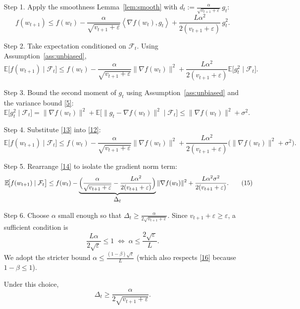 \documentclass{article}
\newcommand{\E}{\mathbb{E}}
\newcommand{\ip}[2]{\left\langle #1,#2 \right\rangle}
\begin{document}
\begin{enumerate}
\item[Step 1.] Apply the smoothness Lemma~\ref{lem:smooth} with
$d_{t}:=\frac{\alpha}{\sqrt{v_{t+1}+\varepsilon}}\,g_{t}$:
\[
f(w_{t+1})\le 
f(w_{t})-\frac{\alpha}{\sqrt{v_{t+1}+\varepsilon}}
\ip{\nabla f(w_{t})}{g_{t}}
+\frac{L\alpha^{2}}{2(v_{t+1}+\varepsilon)}\,g_{t}^{2}.
\tag{11}
\]

\item[Step 2.] Take expectation conditioned on $\mathcal{F}_{t}$.
Using Assumption~\ref{ass:unbiased},
\[
\E\!\bigl[f(w_{t+1})\mid\mathcal{F}_{t}\bigr]
\le 
f(w_{t})-\frac{\alpha}{\sqrt{v_{t+1}+\varepsilon}}
\|\nabla f(w_{t})\|^{2}
+\frac{L\alpha^{2}}{2(v_{t+1}+\varepsilon)}\E\!\bigl[g_{t}^{2}\mid\mathcal{F}_{t}\bigr].
\tag{12}
\]

\item[Step 3.] Bound the second moment of $g_{t}$ using
Assumption~\ref{ass:unbiased} and the variance bound \eqref{5}:
\[
\E\!\bigl[g_{t}^{2}\mid\mathcal{F}_{t}\bigr]
= \|\nabla f(w_{t})\|^{2}
+ \E\!\bigl[\|g_{t}-\nabla f(w_{t})\|^{2}\mid\mathcal{F}_{t}\bigr]
\le \|\nabla f(w_{t})\|^{2}+\sigma^{2}.
\tag{13}
\]

\item[Step 4.] Substitute \eqref{13} into \eqref{12}:
\[
\E\!\bigl[f(w_{t+1})\mid\mathcal{F}_{t}\bigr]
\le 
f(w_{t})
-\frac{\alpha}{\sqrt{v_{t+1}+\varepsilon}}
\|\nabla f(w_{t})\|^{2}
+\frac{L\alpha^{2}}{2(v_{t+1}+\varepsilon)}
\bigl(\|\nabla f(w_{t})\|^{2}+\sigma^{2}\bigr).
\tag{14}
\]

\item[Step 5.] Rearrange \eqref{14} to isolate the gradient norm term:
\[
\E\!\bigl[f(w_{t+1})\mid\mathcal{F}_{t}\bigr]
\le 
f(w_{t})
-\underbrace{\Bigl(\frac{\alpha}{\sqrt{v_{t+1}+\varepsilon}}
-\frac{L\alpha^{2}}{2(v_{t+1}+\varepsilon)}\Bigr)}_{\displaystyle\Delta_{t}}
\|\nabla f(w_{t})\|^{2}
+\frac{L\alpha^{2}\sigma^{2}}{2(v_{t+1}+\varepsilon)}.
\tag{15}
\]

\item[Step 6.] Choose $\alpha$ small enough so that $\Delta_{t}\ge
\frac{\alpha}{2\sqrt{v_{t+1}+\varepsilon}}$.  Since $v_{t+1}+\varepsilon\ge
\varepsilon$, a sufficient condition is
\[
\frac{L\alpha}{2\sqrt{\varepsilon}}\le 1
\;\Longleftrightarrow\;
\alpha\le \frac{2\sqrt{\varepsilon}}{L}.
\tag{16}
\]
We adopt the stricter bound $\alpha\le\frac{(1-\beta)\sqrt{\varepsilon}}{L}$
(which also respects \eqref{16} because $1-\beta\le 1$).

Under this choice,
\[
\Delta_{t}\ge\frac{\alpha}{2\sqrt{v_{t+1}+\varepsilon}}.
\tag{17}
\]


\end{enumerate}
\end{document}
